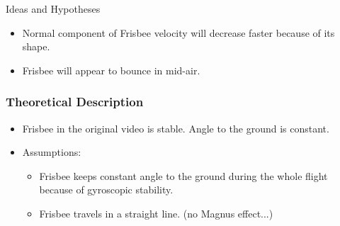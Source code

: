 \documentclass{beamer}
\begin{document}
\begin{frame}

\begin{block}{Ideas and Hypotheses}
\begin{itemize}
\item Normal component of Frisbee velocity will decrease faster because of its shape.

\item Frisbee will appear to bounce in mid-air.
\end{itemize}
\end{block}

\end{frame}


\begin{frame}

\frametitle{Theoretical Description}

\begin{block}{}
\begin{itemize}
\item Frisbee in the original video is stable. Angle to the ground is constant.

\item Assumptions:

\begin{itemize}
\item Frisbee keeps constant angle to the ground during the whole flight because of gyroscopic stability.

\item Frisbee travels in a straight line. (no Magnus effect...)
\end{itemize}
\end{itemize}
\end{block}

\end{frame}

\end{document}

